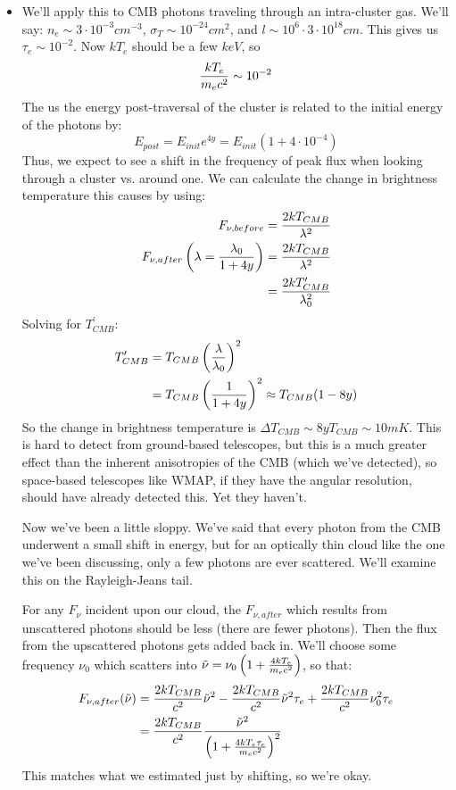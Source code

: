 \documentclass[11pt]{article}
\def\e#1{\cdot10^{#1}}
\begin{document}
\begin{itemize}
\item We'll apply this to CMB photons traveling through an intra-cluster
gas.  We'll say: $n_e\sim3\e{-3}cm^{-3}$, $\sigma_T\sim10^{-24}cm^2$, and 
$l\sim10^6\cdot3\e{18}cm$.  This gives us $\tau_e\sim10^{-2}$.  Now 
$kT_e$ should be a few $keV$, so $${kT_e\over m_ec^2}\sim10^{-2}$$
The us the energy post-traversal of the cluster is related to the initial
energy of the photons by:
$$E_{post}=E_{init}e^{4y}=E_{init}(1+4\e{-4})$$
Thus, we expect to see a shift in the frequency of peak flux when looking
through a cluster vs. around one.  We can calculate the change in brightness
temperature this causes by using:
$$\begin{aligned}F_{\nu,before}&={2kT_{CMB}\over\lambda^2}\\ 
F_{\nu,after}\left(\lambda={\lambda_0\over1+4y}\right)
&={2kT_{CMB}\over\lambda^2}\\ 
&={2kT_{CMB}^\prime\over\lambda_0^2}\\ \end{aligned}$$
Solving for $T_{CMB}^\prime$:
$$\begin{aligned}T_{CMB}^\prime&=T_{CMB}\left({\lambda\over\lambda_0}\right)^2\\ 
&=T_{CMB}\left({1\over1+4y}\right)^2\approx T_{CMB}(1-8y)\\ \end{aligned}$$
So the change in brightness temperature is $\Delta T_{CMB}\sim8yT_{CMB}\sim
10mK$.  This is hard to detect from ground-based telescopes, but this is
a much greater effect than the inherent anisotropies of the CMB (which we've
detected), so space-based telescopes like WMAP, if they have the angular
resolution, should have already detected this.  Yet they haven't.\par
Now we've been a little sloppy.  We've said that every photon from the CMB
underwent a small shift in energy, but for an optically thin cloud like the
one we've been discussing, only a few photons are ever scattered.  We'll examine
this on the Rayleigh-Jeans tail.\par
For any $F_\nu$ incident upon our cloud, the $F_{\nu,after}$ which results
from unscattered photons should be less (there are fewer photons).  Then the
flux from the upscattered photons gets added back in.  We'll choose some
frequency $\nu_0$ which scatters into ${\tilde\nu}=\nu_0\left(1+{4kT_e\over m_ec^2}
\right)$, so that:
$$\begin{aligned}F_{\nu,after}({\tilde\nu})
&={2kT_{CMB}\over c^2}{\tilde\nu}^2-{2kT_{CMB}\over c^2}{\tilde\nu}^2\tau_e
+{2kT_{CMB}\over c^2}\nu_0^2\tau_e\\ 
&={2kT_{CMB}\over c^2}
{{\tilde\nu}^2\over\left(1+{4kT_e\tau_e\over m_ec^2}\right)^2}\\ \end{aligned}$$
This matches what we estimated just by shifting, so we're okay.\par


\end{itemize}
\end{document}
